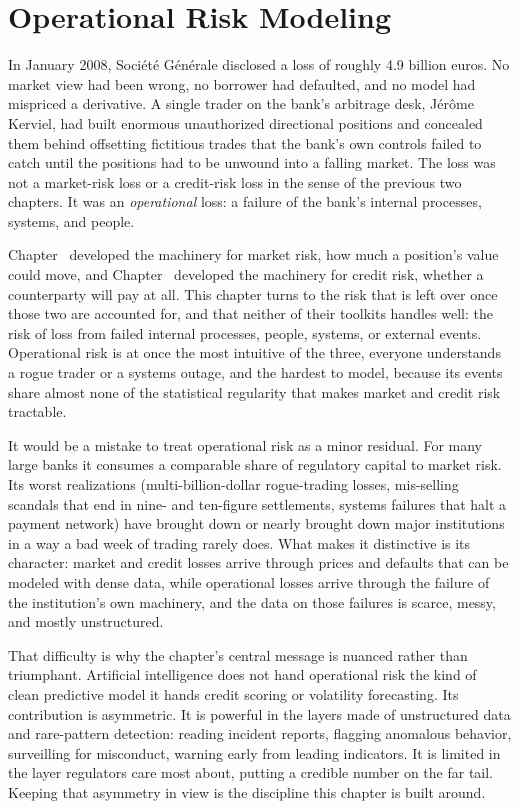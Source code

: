 \documentclass[../ai_in_finance]{subfiles}
\begin{document}
\chapter{Operational Risk Modeling}

In January 2008, Société Générale disclosed a loss of roughly 4.9 billion euros. No market view had been wrong, no borrower had defaulted, and no model had mispriced a derivative. A single trader on the bank's arbitrage desk, Jérôme Kerviel, had built enormous unauthorized directional positions and concealed them behind offsetting fictitious trades that the bank's own controls failed to catch until the positions had to be unwound into a falling market. The loss was not a market-risk loss or a credit-risk loss in the sense of the previous two chapters. It was an \emph{operational} loss: a failure of the bank's internal processes, systems, and people.

Chapter~ developed the machinery for market risk, how much a position's value could move, and Chapter~ developed the machinery for credit risk, whether a counterparty will pay at all. This chapter turns to the risk that is left over once those two are accounted for, and that neither of their toolkits handles well: the risk of loss from failed internal processes, people, systems, or external events. Operational risk is at once the most intuitive of the three, everyone understands a rogue trader or a systems outage, and the hardest to model, because its events share almost none of the statistical regularity that makes market and credit risk tractable.

It would be a mistake to treat operational risk as a minor residual. For many large banks it consumes a comparable share of regulatory capital to market risk. Its worst realizations (multi-billion-dollar rogue-trading losses, mis-selling scandals that end in nine- and ten-figure settlements, systems failures that halt a payment network) have brought down or nearly brought down major institutions in a way a bad week of trading rarely does. What makes it distinctive is its character: market and credit losses arrive through prices and defaults that can be modeled with dense data, while operational losses arrive through the failure of the institution's own machinery, and the data on those failures is scarce, messy, and mostly unstructured.

That difficulty is why the chapter's central message is nuanced rather than triumphant. Artificial intelligence does not hand operational risk the kind of clean predictive model it hands credit scoring or volatility forecasting. Its contribution is asymmetric. It is powerful in the layers made of unstructured data and rare-pattern detection: reading incident reports, flagging anomalous behavior, surveilling for misconduct, warning early from leading indicators. It is limited in the layer regulators care most about, putting a credible number on the far tail. Keeping that asymmetry in view is the discipline this chapter is built around.
\end{document}
